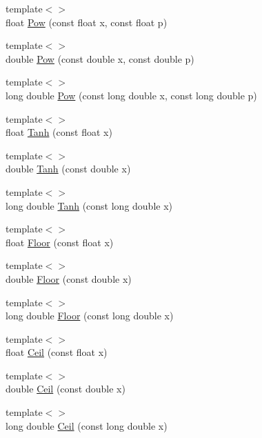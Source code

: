 \begin{DoxyCompactItemize}
\item 
{\footnotesize template$<$$>$ }\\float \hyperlink{contrafold_2_utilities_8ipp_ae4f509181dd7a42e98267e3f0ef18c8d}{Pow} (const float x, const float p)
\item 
{\footnotesize template$<$$>$ }\\double \hyperlink{contrafold_2_utilities_8ipp_aafa41a71b0aa28c33527782582947a82}{Pow} (const double x, const double p)
\item 
{\footnotesize template$<$$>$ }\\long double \hyperlink{contrafold_2_utilities_8ipp_a953211ef1495e3dc51dcb8339c678d4a}{Pow} (const long double x, const long double p)
\item 
{\footnotesize template$<$$>$ }\\float \hyperlink{contrafold_2_utilities_8ipp_a24d55b16cddfc4fe0af075f240b25540}{Tanh} (const float x)
\item 
{\footnotesize template$<$$>$ }\\double \hyperlink{contrafold_2_utilities_8ipp_adb1c85d0bda6cf2001ffe68905e75449}{Tanh} (const double x)
\item 
{\footnotesize template$<$$>$ }\\long double \hyperlink{contrafold_2_utilities_8ipp_a2bf8ddaeb4bd14a5fa1f7cf5956226f5}{Tanh} (const long double x)
\item 
{\footnotesize template$<$$>$ }\\float \hyperlink{contrafold_2_utilities_8ipp_a64f07f7a1670dbc6301e28ed189d5c5b}{Floor} (const float x)
\item 
{\footnotesize template$<$$>$ }\\double \hyperlink{contrafold_2_utilities_8ipp_a4120c652cf61384339b11d3e5fc7be23}{Floor} (const double x)
\item 
{\footnotesize template$<$$>$ }\\long double \hyperlink{contrafold_2_utilities_8ipp_a26259e203b171dd19e6e2c4191c44930}{Floor} (const long double x)
\item 
{\footnotesize template$<$$>$ }\\float \hyperlink{contrafold_2_utilities_8ipp_af7a641a4f57fdc795c681a94af7b17e3}{Ceil} (const float x)
\item 
{\footnotesize template$<$$>$ }\\double \hyperlink{contrafold_2_utilities_8ipp_a79a897daf89a92e047c2b6e61a7d4346}{Ceil} (const double x)
\item 
{\footnotesize template$<$$>$ }\\long double \hyperlink{contrafold_2_utilities_8ipp_a64a35b37618ffed226bdac8787a901af}{Ceil} (const long double x)

\end{DoxyCompactItemize}

